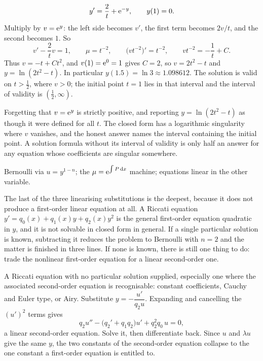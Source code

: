 \begin{worked}
\[y'=\frac{2}{t}+\mathrm{e}^{-y},\qquad y(1)=0.\]
Multiply by $v=\mathrm{e}^{y}$: the left side becomes $v'$, the first term becomes $2v/t$, and the second becomes $1$. So
\[v'-\frac{2}{t}v=1,\qquad \mu=t^{-2},\qquad \bigl(vt^{-2}\bigr)'=t^{-2},\qquad vt^{-2}=-\frac1t+C.\]
Thus $v=-t+Ct^{2}$, and $v(1)=\mathrm{e}^{0}=1$ gives $C=2$, so $v=2t^{2}-t$ and $y=\ln(2t^{2}-t)$. In particular $y(1.5)=\ln3\approx1.098612$. The solution is valid on $t>\tfrac12$, where $v>0$; the initial point $t=1$ lies in that interval and the interval of validity is $(\tfrac12,\infty)$.
\end{worked}

\begin{trap}
Forgetting that $v=\mathrm{e}^{y}$ is strictly positive, and reporting $y=\ln(2t^{2}-t)$ as though it were defined for all $t$. The closed form has a logarithmic singularity where $v$ vanishes, and the honest answer names the interval containing the initial point. A solution formula without its interval of validity is only half an answer for any equation whose coefficients are singular somewhere.
\end{trap}

\begin{seealsob}Bernoulli via $u=y^{1-n}$; the $\mu=\mathrm{e}^{\int P\,\mathrm{d} x}$ machine; equations linear in the other variable.\end{seealsob}

The last of the three linearising substitutions is the deepest, because it does not produce a first-order linear equation at all. A Riccati equation $y'=q_0(x)+q_1(x)y+q_2(x)y^{2}$ is the general first-order equation quadratic in $y$, and it is not solvable in closed form in general. If a single particular solution is known, subtracting it reduces the problem to Bernoulli with $n=2$ and the matter is finished in three lines. If none is known, there is still one thing to do: trade the nonlinear first-order equation for a linear second-order one.

\cue A Riccati equation with no particular solution supplied, especially one where the associated second-order equation is recognisable: constant coefficients, Cauchy and Euler type, or Airy.
\method Substitute $y=-\dfrac{u'}{q_2u}$. Expanding and cancelling the $(u')^{2}$ terms gives
\[q_2u''-\bigl(q_2'+q_1q_2\bigr)u'+q_2^{2}q_0\,u=0,\]
a linear second-order equation. Solve it, then differentiate back. Since $u$ and $\lambda u$ give the same $y$, the two constants of the second-order equation collapse to the one constant a first-order equation is entitled to.

